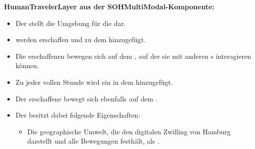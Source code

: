 \textbf{HumanTravelerLayer aus der SOHMultiModal-Komponente:}
\begin{itemize}
    \item Der  stellt die Umgebung für die  dar.
    \item {} werden erschaffen und zu dem  hinzugefügt.
    \item Die erschaffenen  bewegen sich auf dem , auf der sie mit anderen s interagieren können.
    \item Zu jeder vollen Stunde wird ein  in dem  hinzugefügt.
    \item Der erschaffene  bewegt sich ebenfalls auf dem .
    \item Der  besitzt dabei folgende Eigenschaften:
    \begin{itemize}
        \item Die geographische Umwelt, die den digitalen Zwilling von Hamburg darstellt und alle Bewegungen festhält, als .
    \end{itemize}
\end{itemize}

